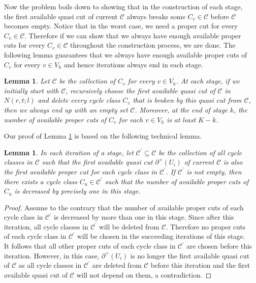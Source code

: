 \documentclass[11pt]{article}
\newtheorem{lemma}[theorem]{Lemma}
\begin{document}
Now the problem boils down to showing that in the construction of each stage, the first available quasi cut of current $\mathcal{C}$ always breaks some $C_v\in\mathcal{C}$ before $\mathcal{C}$ becomes empty. Notice that in the worst case, we need a proper cut for every $C_v\in\mathcal{C}$. Therefore if we can show that we always have enough available proper cuts for every $C_v\in \mathcal{C}$ throughout the construction process, we are done. The following lemma guarantees that we always have enough available proper cuts of $C_v$ for every $v\in V_h$ and hence iterations always end in each stage.

\begin{lemma} 
\label{lem:3}
Let $\mathcal{C}$ be the collection of $C_v$ for every $v\in V_h$. At each stage, if we initially start with $\mathcal{C}$, recursively choose the first available quasi cut of $\mathcal{C}$ in $N(r,t;l)$ and delete every cycle class $C_v$ that is broken by this quasi cut from $\mathcal{C}$, then we always end up with an empty set $\mathcal{C}$. Moreover, at the end of stage $k$, the number of available proper cuts of $C_v$ for each $v\in V_h$ is at least $K-k$.
\end{lemma}

Our proof of Lemma \ref{lem:3} is based on the following technical lemma. 

\begin{lemma}
\label{lem:4} 
In each iteration of a stage, let $\mathcal{C}^\prime\subseteq\mathcal{C}$ be the collection of all cycle classes in $\mathcal{C}$ such that the first available quasi cut $\partial^+(U_i)$ of current $\mathcal{C}$ is also the first available proper cut for each cycle class in $\mathcal{C}^\prime$. If $\mathcal{C}^\prime$ is not empty, then there exists a cycle class $C_u\in \mathcal{C}^\prime$ such that the number of available proper cuts of $C_u$ is decreased by precisely one in this stage.
\end{lemma}

\begin{proof}
Assume to the contrary that the number of available proper cuts of each cycle class in $\mathcal{C}^\prime$ is decreased by more than one in this stage. Since after this iteration, all cycle classes in $\mathcal{C}^\prime$ will be deleted from $\mathcal{C}$. Therefore no proper cuts of each cycle class in $\mathcal{C}^\prime$ will be chosen in the succeeding iterations of this stage. It follows that all other proper cuts of each cycle class in $\mathcal{C}^\prime$ are chosen before this iteration. However, in this case, $\partial^+(U_i)$ is no longer the first available quasi cut of $\mathcal{C}$ as all cycle classes in $\mathcal{C}^\prime$ are deleted from $\mathcal{C}$ before this iteration and the first available quasi cut of $\mathcal{C}$ will not depend on them, a contradiction.
\end{proof}
\end{document}
